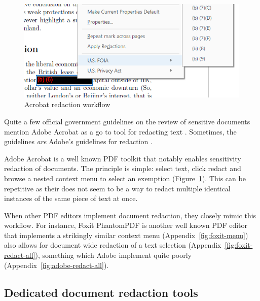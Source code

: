 \documentclass[\version]{l4proj}
\begin{document}
\begin{figure}
    \includegraphics[width=\linewidth]{images/related_products/adobe_redaction.png}
    \caption{Acrobat redaction workflow}\label{fig:adobe-redaction}
    \vspace{-15pt}
\end{figure}

Quite a few official government guidelines on the review of sensitive documents mention Adobe Acrobat as a go to tool for redacting text \autocite{thenationalarchivesRedactionToolkitPaper2016}.
Sometimes, the guidelines \textit{are} Adobe's guidelines for redaction \autocite{scottishgovernmentRedactingInformation2019}.

Adobe Acrobat is a well known PDF toolkit that notably enables sensitivity redaction of documents.
The principle is simple: select text, click redact and browse a nested context menu to select an exemption (Figure~\ref{fig:adobe-redaction}).
This can be repetitive as their does not seem to be a way to redact multiple identical instances of the same piece of text at once.

When other PDF editors implement document redaction, they closely mimic this workflow.
For instance, Foxit PhantomPDF is another well known PDF editor that implements a strikingly similar context menu (Appendix~\ref{fig:foxit-menu}) also allows for document wide redaction of a text selection (Appendix~\ref{fig:foxit-redact-all}), something which Adobe implement quite poorly (Appendix~\ref{fig:adobe-redact-all}).

\subsection{Dedicated document redaction tools}
\end{document}
